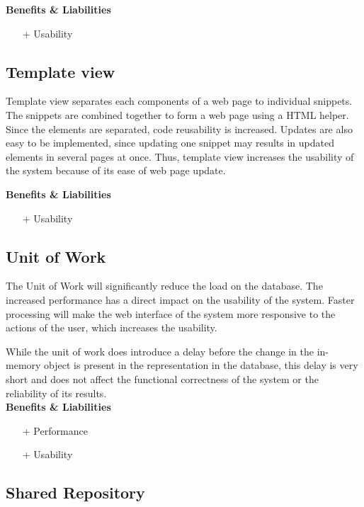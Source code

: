 \textbf{Benefits \& Liabilities} ~
\begin{itemize} 
\item[+] Usability
\end{itemize}

\subsection*{Template view}
Template view separates each components of a web page to individual snippets. The snippets are combined together to form a web page using a HTML helper. Since the elements are separated, code reusability is increased. Updates are also easy to be implemented, since updating one snippet may results in updated elements in several pages at once. Thus, template view increases the usability of the system because of its ease of web page update.

\textbf{Benefits \& Liabilities} ~
\begin{itemize} 
\item[+] Usability
\end{itemize}

\subsection*{Unit of Work}
The Unit of Work will significantly reduce the load on the database. The increased performance has a direct impact on the usability of the system. Faster processing will make the web interface of the system more responsive to the actions of the user, which increases the usability.

While the unit of work does introduce a delay before the change in the in-memory object is present in the representation in the database, this delay is very short and does not affect the functional correctness of the system or the reliability of its results.\\
\textbf{Benefits \& Liabilities} ~
\begin{itemize}
\item[+] Performance 
\item[+] Usability
\end{itemize}


\subsection*{Shared Repository} 

